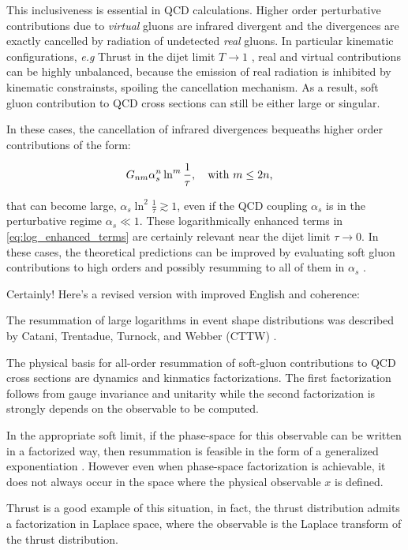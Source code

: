 \documentclass[../main.tex]{subfiles}
\begin{document}
This inclusiveness is essential in QCD calculations. Higher order perturbative contributions due to \emph{virtual}
gluons are infrared divergent and the divergences are exactly  cancelled by radiation of undetected \emph{real} gluons.
In particular kinematic configurations, \emph{e.g} Thrust in the dijet limit $T \to 1$ ,   
real and virtual contributions can be highly unbalanced, because the emission of real radiation is inhibited by kinematic constrainsts,
spoiling the cancellation mechanism. As a result, soft gluon contribution to QCD cross sections can still be either large or singular.

In these cases, the cancellation of infrared divergences bequeaths higher order contributions of the form:

\begin{equation}\label{eq:log_enhanced_terms}
    G_{nm} \alpha_s^n \ln^m \frac{1}{\tau} , \qq{with $m \le 2n $,}
\end{equation}

that can become large, $\alpha_s \ln^2\frac{1}{\tau}\gtrsim 1$, even if the QCD coupling $\alpha_s$ is in the perturbative regime $\alpha_s \ll 1$.
These logarithmically enhanced terms in \cref{eq:log_enhanced_terms} are certainly relevant near the dijet limit $\tau \to 0$.
In these cases, the theoretical predictions can be improved by evaluating soft gluon 
contributions to high orders and possibly resumming to all of them in $\alpha_s$ \cite{CATANI1991491,Monni:2011gb}.

Certainly! Here's a revised version with improved English and coherence:

The resummation of large logarithms in event shape distributions was described by Catani, Trentadue, Turnock, and Webber (CTTW) \cite{CATANI19933}.

The physical basis for all-order resummation of soft-gluon contributions to QCD cross sections are dynamics and kinmatics factorizations. The first factorization follows from 
gauge invariance and unitarity while the second factorization is strongly depends on the observable to be computed.

In the appropriate soft limit, if the phase-space for this observable can be written in a factorized way, then resummation is feasible in the form of a generalized exponentiation \cite{Sterman:1986aj}.
However even when phase-space factorization is achievable, it does not always occur in the space where the physical observable $x$ is defined.

Thrust is a good example of this situation, in fact, the thrust distribution admits a factorization in Laplace space, 
where the observable is the Laplace transform of the thrust distribution. 
\end{document}

